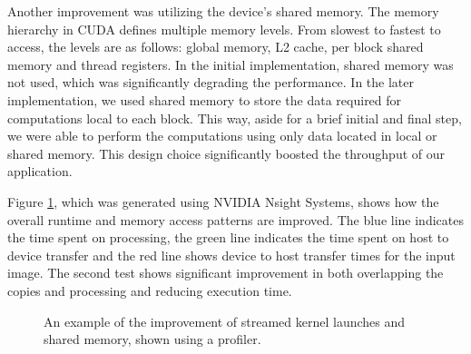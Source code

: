 Another improvement was utilizing the device's shared memory. The memory hierarchy in CUDA defines multiple memory levels. From slowest to fastest to access, the levels are as follows: global memory, L2 cache, per block shared memory and thread registers. In the initial implementation, shared memory was not used, which was significantly degrading the performance. In the later implementation, we used shared memory to store the data required for computations local to each block. This way, aside for a brief initial and final step, we were able to perform the computations using only data located in local or shared memory. This design choice significantly boosted the throughput of our application. 

Figure \ref{fig:cuda_profile}, which was generated using NVIDIA Nsight Systems, shows how the overall runtime and memory access patterns are improved. The blue line indicates the time spent on processing, the green line indicates the time spent on host to device transfer and the red line shows device to host transfer times for the input image. The second test shows significant improvement in both overlapping the copies and processing and reducing execution time.

\begin{figure}[ht]
    \centering
    \caption{An example of the improvement of streamed kernel launches and shared memory, shown using a profiler.}
    \label{fig:cuda_profile}
\end{figure}
